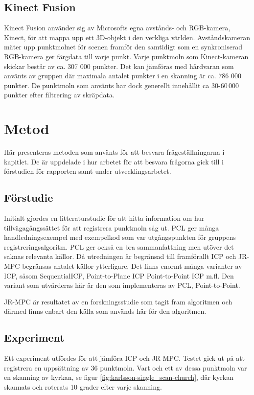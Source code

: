 \subsection{Kinect Fusion}
\label{sec:kinect-karlsson}
Kinect Fusion använder sig av Microsofts egna avstånds- och RGB-kamera, Kinect, för att mappa upp ett 3D-objekt i den verkliga världen. Avståndskameran mäter upp punktmolnet för scenen framför den samtidigt som en synkroniserad RGB-kamera ger färgdata till varje punkt. 
Varje punktmoln som Kinect-kameran skickar består av ca. 307 000 punkter. Det kan jämföras med hårdvaran som använts av gruppen där maximala antalet punkter i en skanning är ca. 786 000 punkter. De punktmoln som använts har dock generellt innehållit ca 30-60\,000 punkter efter filtrering av skräpdata.

\section{Metod}
\label{sec:method-karlsson}

Här presenteras metoden som använts för att besvara frågeställningarna i kapitlet. De är uppdelade i hur arbetet för att besvara frågorna gick till i förstudien för rapporten samt under utvecklingsarbetet.

\subsection{Förstudie}
Initialt gjordes en litteraturstudie för att hitta information om hur tillvägagångssättet för att registrera punktmoln såg ut.  PCL ger många handledningsexempel med exempelkod som var utgångspunkten för gruppens registreringsalgoritm. PCL ger också en bra sammanfattning men utöver det saknas relevanta källor. Då utredningen är begränsad till framförallt ICP och JR-MPC begränsas antalet källor ytterligare. Det finns enormt många varianter av ICP, såsom SequentialICP, Point-to-Plane ICP Point-to-Point ICP m.fl. Den variant som utvärderas här är den som implementeras av PCL, Point-to-Point. 

JR-MPC är resultatet av en forskningsstudie som tagit fram algoritmen och därmed finns enbart den källa som används här för den algoritmen. 

\subsection{Experiment}
Ett experiment utfördes för att jämföra ICP och JR-MPC. Testet gick ut på att registrera en uppsättning av 36 punktmoln. Vart och ett av dessa punktmoln var en skanning av kyrkan, se figur \ref{fig:karlsson-single_scan-church}, där kyrkan skannats och roterats 10 grader efter varje skanning. 

